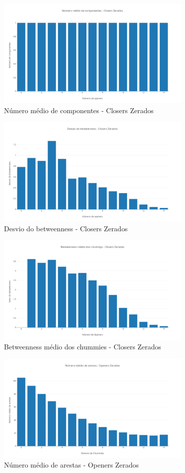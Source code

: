 \documentclass[12pt]{article}
\begin{document}
\begin{figure}[H]
	\centering
	\includegraphics[width=\textwidth, height=200px]{basic-bar_7.png}
	\caption{Número médio de componentes - Closers Zerados}
	\label{fig7}
\end{figure}

\begin{figure}[H]
	\centering
	\includegraphics[width=\textwidth, height=200px]{basic-bar_8.png}
	\caption{Desvio do betweenness - Closers Zerados}
	\label{fig8}
\end{figure}

\begin{figure}[H]
	\centering
	\includegraphics[width=\textwidth, height=200px]{basic-bar_9.png}
	\caption{Betweenness médio dos chummies - Closers Zerados}
	\label{fig9}
\end{figure}

\begin{figure}[H]
	\centering
	\includegraphics[width=\textwidth, height=200px]{basic-bar_11.png}
	\caption{Número médio de arestas - Openers Zerados}
	\label{fig10}
\end{figure}
\end{document}

